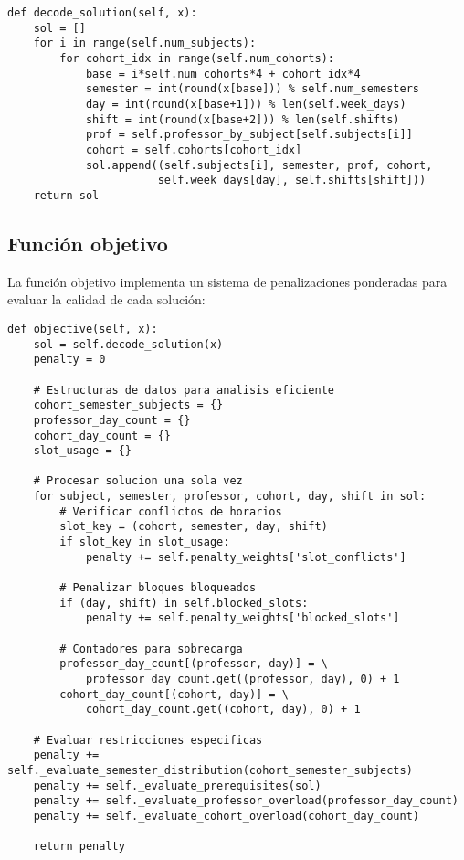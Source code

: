 \begin{verbatim}
def decode_solution(self, x):
    sol = []
    for i in range(self.num_subjects):
        for cohort_idx in range(self.num_cohorts):
            base = i*self.num_cohorts*4 + cohort_idx*4
            semester = int(round(x[base])) % self.num_semesters
            day = int(round(x[base+1])) % len(self.week_days)
            shift = int(round(x[base+2])) % len(self.shifts)
            prof = self.professor_by_subject[self.subjects[i]]
            cohort = self.cohorts[cohort_idx]
            sol.append((self.subjects[i], semester, prof, cohort, 
                       self.week_days[day], self.shifts[shift]))
    return sol
\end{verbatim}

\subsection{Función objetivo}

La función objetivo implementa un sistema de penalizaciones ponderadas para evaluar la calidad de cada solución:

\begin{verbatim}
def objective(self, x):
    sol = self.decode_solution(x)
    penalty = 0
    
    # Estructuras de datos para analisis eficiente
    cohort_semester_subjects = {}
    professor_day_count = {}
    cohort_day_count = {}
    slot_usage = {}
    
    # Procesar solucion una sola vez
    for subject, semester, professor, cohort, day, shift in sol:
        # Verificar conflictos de horarios
        slot_key = (cohort, semester, day, shift)
        if slot_key in slot_usage:
            penalty += self.penalty_weights['slot_conflicts']
        
        # Penalizar bloques bloqueados
        if (day, shift) in self.blocked_slots:
            penalty += self.penalty_weights['blocked_slots']
        
        # Contadores para sobrecarga
        professor_day_count[(professor, day)] = \
            professor_day_count.get((professor, day), 0) + 1
        cohort_day_count[(cohort, day)] = \
            cohort_day_count.get((cohort, day), 0) + 1
    
    # Evaluar restricciones especificas
    penalty += self._evaluate_semester_distribution(cohort_semester_subjects)
    penalty += self._evaluate_prerequisites(sol)
    penalty += self._evaluate_professor_overload(professor_day_count)
    penalty += self._evaluate_cohort_overload(cohort_day_count)
    
    return penalty
\end{verbatim}

